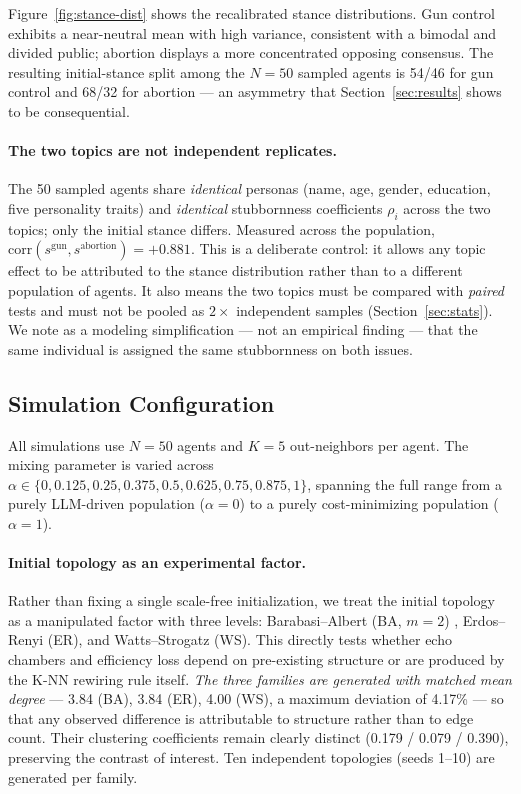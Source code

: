 Figure~\ref{fig:stance-dist} shows the recalibrated stance distributions. Gun control
exhibits a near-neutral mean with high variance, consistent with a bimodal and divided
public; abortion displays a more concentrated opposing consensus. The resulting
initial-stance split among the $N = 50$ sampled agents is 54/46 for gun control and
68/32 for abortion --- an asymmetry that Section~\ref{sec:results} shows to be
consequential.

\paragraph{The two topics are not independent replicates.}
The 50 sampled agents share \emph{identical} personas (name, age, gender, education,
five personality traits) and \emph{identical} stubbornness coefficients $\rho_i$ across
the two topics; only the initial stance differs. Measured across the population,
$\mathrm{corr}(s^{\text{gun}}, s^{\text{abortion}}) = +0.881$. This is a deliberate
control: it allows any topic effect to be attributed to the stance distribution rather
than to a different population of agents. It also means the two topics must be compared
with \emph{paired} tests and must not be pooled as $2\times$ independent samples
(Section~\ref{sec:stats}). We note as a modeling simplification --- not an empirical
finding --- that the same individual is assigned the same stubbornness on both issues.

\subsection{Simulation Configuration}
\label{sec:config}

All simulations use $N = 50$ agents and $K = 5$ out-neighbors per agent. The mixing
parameter is varied across
$\alpha \in \{0, 0.125, 0.25, 0.375, 0.5, 0.625, 0.75, 0.875, 1\}$, spanning the full
range from a purely LLM-driven population ($\alpha = 0$) to a purely cost-minimizing
population ($\alpha = 1$).

\paragraph{Initial topology as an experimental factor.}
Rather than fixing a single scale-free initialization, we treat the initial topology as
a manipulated factor with three levels: Barabasi--Albert (BA, $m=2$)
\citep{barabasi1999emergence}, Erdos--Renyi (ER), and Watts--Strogatz (WS). This
directly tests whether echo chambers and efficiency loss depend on pre-existing
structure or are produced by the K-NN rewiring rule itself. \emph{The three families are
generated with matched mean degree} --- 3.84 (BA), 3.84 (ER), 4.00 (WS), a maximum
deviation of 4.17\% --- so that any observed difference is attributable to structure
rather than to edge count. Their clustering coefficients remain clearly distinct
(0.179 / 0.079 / 0.390), preserving the contrast of interest. Ten independent
topologies (seeds 1--10) are generated per family.

